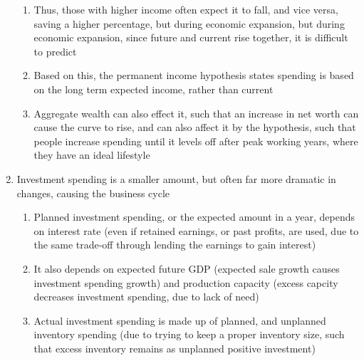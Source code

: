 \documentclass[11 pt, twoside]{article}
\begin{document}
\begin{enumerate}
\begin{enumerate}
\item Thus, those with higher income often expect it to fall, and vice versa, saving a higher percentage, but during economic expansion, but during economic expansion, since future and current rise together, it is difficult to predict
\item Based on this, the permanent income hypothesis states spending is based on the long term expected income, rather than current
\item Aggregate wealth can also effect it, such that an increase in net worth can cause the curve to rise, and can also affect it by the hypothesis, such that people increase spending until it levels off after peak working years, where they have an ideal lifestyle
\end{enumerate}
\item Investment spending is a smaller amount, but often far more dramatic in changes, causing the business cycle
\begin{enumerate}
\item Planned investment spending, or the expected amount in a year, depends on interest rate (even if retained earnings, or past profits, are used, due to the same trade-off through lending the earnings to gain interest)
\item It also depends on expected future GDP (expected sale growth causes investment spending growth) and production capacity (excess capcity decreases investment spending, due to lack of need)
\item Actual investment spending is made up of planned, and unplanned inventory spending (due to trying to keep a proper inventory size, such that excess inventory remains as unplanned positive investment)
\end{enumerate}
\end{enumerate}
\end{document}
